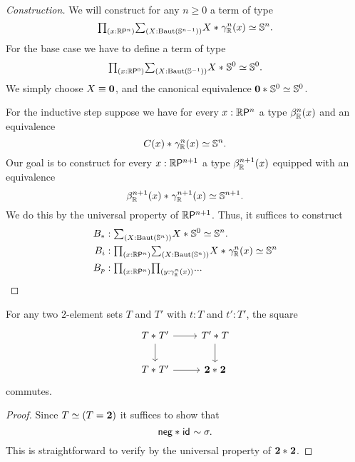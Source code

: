 \begin{proof}[Construction]
We will construct for any $n\geq 0$ a term of type
\begin{equation*}
\prd{x:\rprojective{n}} \sm{X:\BAut(\sphere{n-1})} \eqv{\join{X}{\tautfam[\R]{n}(x)}}{\sphere{n}}.
\end{equation*}
For the base case we have to define a term of type
\begin{equation*}
\prd{x:\rprojective{0}} \sm{X:\BAut(\sphere{-1})} \eqv{\join{X}{\sphere{0}}}{\sphere{0}}.
\end{equation*}
We simply choose $X\jdeq \emptyt$, and the canonical equivalence $\eqv{\join{\emptyt}{\sphere{0}}}{\sphere{0}}$. 

For the inductive step suppose we have for every $x:\rprojective{n}$ a type $\orthcomp[\R]{n}(x)$ and an equivalence
\begin{equation*}
\eqv{\join{C(x)}{\tautfam[\R]{n}(x)}}{\sphere{n}}.
\end{equation*}
Our goal is to construct for every $x:\rprojective{n+1}$ a type $\orthcomp[\mathbb{R}]{n+1}(x)$ equipped with an equivalence
\begin{equation*}
\eqv{\join{\orthcomp[\mathbb{R}]{n+1}(x)}{\tautfam[\R]{n+1}(x)}}{\sphere{n+1}}.
\end{equation*}
We do this by the universal property of $\rprojective{n+1}$. Thus, it suffices to construct
\begin{align*}
B_{\pt} & : \sm{X:\BAut(\sphere{n})}\eqv{\join{X}{\sphere{0}}}{\sphere{n}}.\\
B_i & : \prd{x:\rprojective{n}}\sm{X:\BAut(\sphere{n})}\eqv{\join{X}{\tautfam[\R]{n}(x)}}{\sphere{n}} \\
B_p & : \prd{x:\rprojective{n}}{y:\tautfam[\R]{n}(x)} ... 
\end{align*}
\end{proof}

\begin{lem}
For any two $2$-element sets $T$ and $T'$ with $t:T$ and $t':T'$, the square
\begin{equation*}
\begin{tikzcd}
\join{T}{T'} \arrow[r] \arrow[d] & \join{T'}{T} \arrow[d] \\
\join{T}{T'} \arrow[r] & \join{\bool}{\bool}
\end{tikzcd}
\end{equation*}
commutes.
\end{lem}

\begin{proof}
Since $\eqv{T}{(T=\bool)}$ it suffices to show that
\begin{equation*}
\join{\mathsf{neg}}{\idfunc}\htpy \sigma.
\end{equation*}
This is straightforward to verify by the universal property of $\join{\bool}{\bool}$. 
\end{proof}
